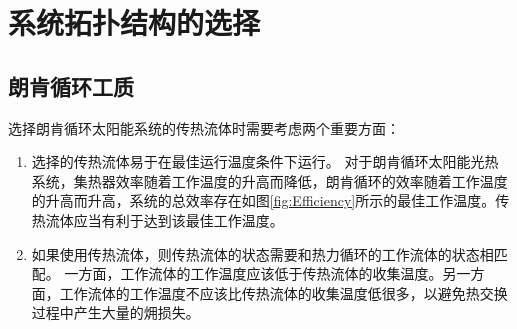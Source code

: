 \section{系统拓扑结构的选择}
\label{sec:sts}
\subsection{朗肯循环工质}

选择朗肯循环太阳能系统的传热流体时需要考虑两个重要方面：
\begin{enumerate}
  \item 选择的传热流体易于在最佳运行温度条件下运行。
 对于朗肯循环太阳能光热系统，集热器效率随着工作温度的升高而降低，朗肯循环的效率随着工作温度的升高而升高，系统的总效率存在如图\ref{fig:Efficiency}所示的最佳工作温度。传热流体应当有利于达到该最佳工作温度。  
  
  \item 如果使用传热流体，则传热流体的状态需要和热力循环的工作流体的状态相匹配。
  一方面，工作流体的工作温度应该低于传热流体的收集温度。另一方面，工作流体的工作温度不应该比传热流体的收集温度低很多，以避免热交换过程中产生大量的㶲损失。
  
\end{enumerate}

